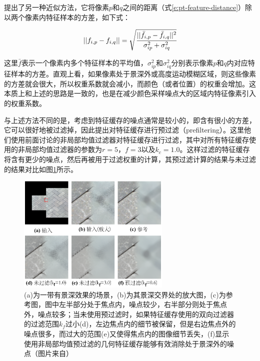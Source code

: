 \cite{a:SUREbasedOptimizationforAdaptiveSamplingandReconstruction}提出了另一种近似方法，它将像素$p$和$q$之间的距离（式\ref{e:pt-feature-distance}）除以两个像素内特征样本的方差，如下式：

\begin{equation}
	||f_{i,p}-f_{i,q}||=\sqrt{ \cfrac{||\bar{f}_{i,p}-\bar{f}_{i,q}||^{2}}{\sigma^{2}_{ip}+\sigma^{2}_{iq}}}
\end{equation}

\noindent 这里$\bar{f}$表示一个像素内多个特征样本的平均值，$\sigma^{2}_{ip}$和$\sigma^{2}_{iq}$分别表示像素$p$和$q$内对应特征样本的方差。直观上看，如果像素处于景深外或高度运动模糊区域，则这些像素的方差就会很大，所以权重系数就会减小，而颜色（或者位置）的权重会增加。这本质上和上述的思路是一致的，也是在减少颜色采样噪点大的区域内特征像素引入的权重系数。

与上述方法不同的是，考虑到特征缓存的噪点通常是较小的，即含有很小的方差，它可以很好地被过滤掉，因此\cite{a:RobustDenoisingusingFeatureandColorInformation}提出对特征缓存进行预过滤（prefiltering）。这里他们使用前面讨论的非局部均值过滤器对特征缓存进行过滤，其中对所有特征缓存使用的非局部均值过滤器的参数为$r=5$，$f=3$以及$k_c=1.0$。这样过滤的特征缓存将含有更少的噪点，然后再被用于过滤权重的计算，其预过滤计算的结果与未过滤的结果对比如图\ref{f:pt-prefiltering}所示。

\begin{figure}
	\sidecaption
	\includegraphics[width=0.65\textwidth]{figures/pt/prefiltering}
	\caption{(a)为一带有景深效果的场景，(b)为其景深交界处的放大图，(c)为参考图，图中左半部分处于焦点内，噪点较少，右半部分则处于焦点外，噪点较多；当未使用预过滤时，如果特征缓存使用的双向过滤器的过滤范围$k_f$过小(d)，左边焦点内的细节被保留，但是右边焦点外的噪点很多，而过大的范围(e)又使得焦点内的图像细节丢失，(f)显示使用非局部均值预过滤的几何特征缓存能够有效消除处于景深外的噪点（图片来自\cite{a:RobustDenoisingusingFeatureandColorInformation}）}
	\label{f:pt-prefiltering}
\end{figure}

